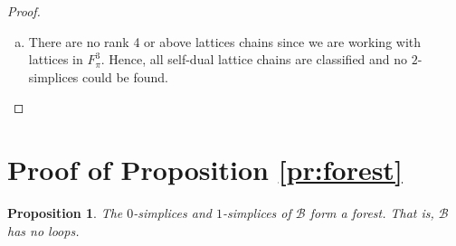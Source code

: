\documentclass{eptcs}
\newtheorem{proposition}[theorem]{Proposition}
\theoremstyle{remark}
\theoremstyle{definition}
\begin{document}
\begin{proof}
\begin{enumerate}[(a)]
	Hence, we must necessarily have that this lattice chain is of the type given in the statement and is a $1$-simplex since it contains the two types of $0$-simplices demonstrated above.

	\item There are no rank 4 or above lattices chains since we are working with lattices in $F_{\pi}^3$. Hence, all self-dual lattice chains are classified and no $2$-simplices could be found.
\end{enumerate}
\end{proof}
\section{Proof of Proposition \ref{pr:forest}}
\label{se:forest_proof}
\begin{proposition}
    The $0$-simplices and $1$-simplices of $\mathcal{B}$ form a forest. That is, $\mathcal{B}$ has no loops.
\end{proposition}
\end{document}

